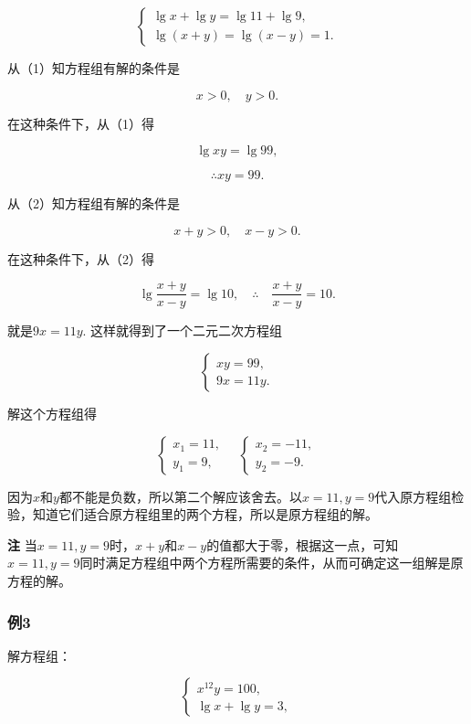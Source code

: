 \[
\left\{ \begin{array}{l} \lg x + \lg y = \lg 11 + \lg 9, \\ \lg (x + y) = \lg (x - y) = 1. \end{array} \right. \tag {1}
\]

 从（1）知方程组有解的条件是

\[
x > 0, \quad y > 0.
\]

在这种条件下，从（1）得

\[
\lg x y = \lg 99,
\]

\[
\therefore x y = 99.
\]

从（2）知方程组有解的条件是

\[
x + y > 0, \quad x - y > 0.
\]

在这种条件下，从（2）得

\[
\lg \frac{x + y}{x - y} = \lg 10, \quad \therefore \quad \frac{x + y}{x - y} = 10.
\]

就是\(9x = 11y.\) 这样就得到了一个二元二次方程组

\[
\left\{ \begin{array}{l} x y = 99, \\ 9 x = 11 y. \end{array} \right.
\]

解这个方程组得

\[
\left\{ \begin{array}{l} x_{1} = 11, \\ y_{1} = 9, \end{array} \right. \quad \left\{ \begin{array}{l} x_{2} = - 11, \\ y_{2} = - 9. \end{array} \right.
\]

因为\(x\)和\(y\)都不能是负数，所以第二个解应该舍去。以\(x = 11, y = 9\)代入原方程组检验，知道它们适合原方程组里的两个方程，所以是原方程组的解。

\textbf{注}
当\(x = 11, y = 9\)时，\(x + y\)和\(x - y\)的值都大于零，根据这一点，可知\(x = 11, y = 9\)同时满足方程组中两个方程所需要的条件，从而可确定这一组解是原方程的解。

\subsubsection{例3}

解方程组：

\[
\left\{ \begin{array}{l} x^{12} y = 100, \\ \lg x + \lg y = 3, \end{array} \right. \tag {1}
\]

